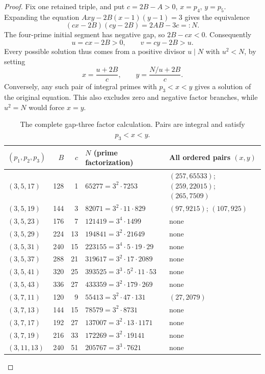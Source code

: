 \documentclass[11pt]{article}
\begin{document}
\begin{proof}
Fix one retained triple, and put $c=2B-A>0$, $x=p_4$, $y=p_5$.
Expanding the equation $Axy-2B(x-1)(y-1)=3$ gives the equivalence
\begin{equation}\label{eq:factor}
 (cx-2B)(cy-2B)=2AB-3c=:N.
\end{equation}
The four-prime initial segment has negative gap, so
$2B-cx<0$. Consequently
\[
 u=cx-2B>0,\qquad v=cy-2B>u.
\]
Every possible solution thus comes from a positive divisor $u\mid N$
with $u^2<N$, by setting
\begin{equation}\label{eq:recover}
 x=\frac{u+2B}{c},\qquad
 y=\frac{N/u+2B}{c}.
\end{equation}
Conversely, any such pair of integral primes with $p_3<x<y$ gives a
solution of the original equation. This also excludes zero and negative
factor branches, while $u^2=N$ would force $x=y$.

\begin{table}[htbp]
\centering\small
\caption{The complete gap-three factor calculation. Pairs are integral and satisfy $p_3<x<y$.}
\label{tab:factors}
\begin{tabular}{@{}lrrl p{4.05cm}@{}}
\toprule
$(p_1,p_2,p_3)$ & $B$ & $c$ & $N$ (prime factorization) & All ordered pairs $(x,y)$\\
\midrule
$(3,5,17)$ & 128 & 1 & $65277=3^{2}\cdot7253$ & $(257,65533)$; $(259,22015)$; $(265,7509)$\\
$(3,5,19)$ & 144 & 3 & $82071=3^{2}\cdot11\cdot829$ & $(97,9215)$; $(107,925)$\\
$(3,5,23)$ & 176 & 7 & $121419=3^{4}\cdot1499$ & none\\
$(3,5,29)$ & 224 & 13 & $194841=3^{2}\cdot21649$ & none\\
$(3,5,31)$ & 240 & 15 & $223155=3^{4}\cdot5\cdot19\cdot29$ & none\\
$(3,5,37)$ & 288 & 21 & $319617=3^{2}\cdot17\cdot2089$ & none\\
$(3,5,41)$ & 320 & 25 & $393525=3^{3}\cdot5^{2}\cdot11\cdot53$ & none\\
$(3,5,43)$ & 336 & 27 & $433359=3^{2}\cdot179\cdot269$ & none\\
$(3,7,11)$ & 120 & 9 & $55413=3^{2}\cdot47\cdot131$ & $(27,2079)$\\
$(3,7,13)$ & 144 & 15 & $78579=3^{2}\cdot8731$ & none\\
$(3,7,17)$ & 192 & 27 & $137007=3^{2}\cdot13\cdot1171$ & none\\
$(3,7,19)$ & 216 & 33 & $172269=3^{2}\cdot19141$ & none\\
$(3,11,13)$ & 240 & 51 & $205767=3^{3}\cdot7621$ & none\\
\bottomrule
\end{tabular}
\end{table}


\end{proof}
\end{document}

